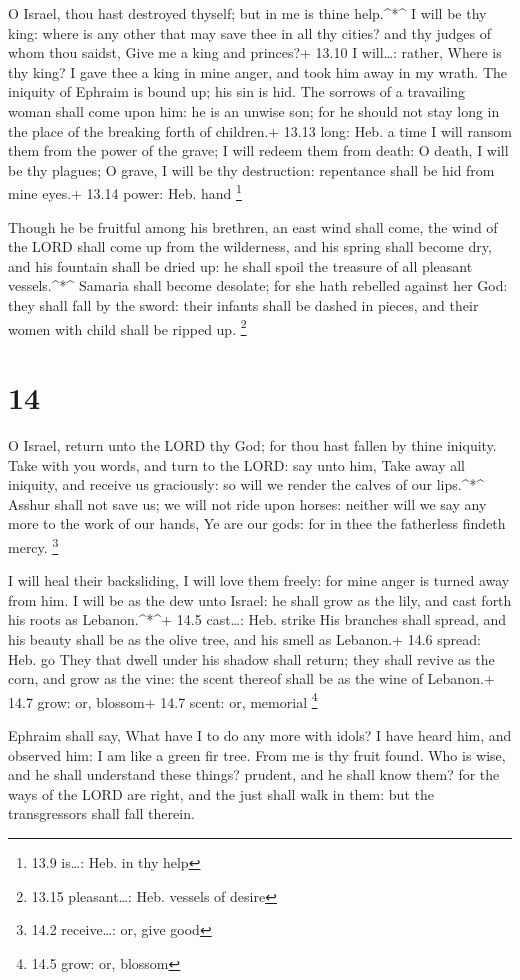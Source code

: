  O Israel, thou hast destroyed thyself; but in me is thine
help.\^{}*\^{}  I will be thy king: where is any other that
may save thee in all thy cities? and thy judges of whom thou saidst,
Give me a king and princes?+ 13.10 I will\ldots: rather, Where is thy
king?  I gave thee a king in mine anger, and took him away
in my wrath.  The iniquity of Ephraim is bound up; his sin
is hid.  The sorrows of a travailing woman shall come upon
him: he is an unwise son; for he should not stay long in the place of
the breaking forth of children.+ 13.13 long: Heb. a time  I
will ransom them from the power of the grave; I will redeem them from
death: O death, I will be thy plagues; O grave, I will be thy
destruction: repentance shall be hid from mine eyes.+ 13.14 power: Heb.
hand \footnote{13.9 is\ldots: Heb. in thy help}

 Though he be fruitful among his brethren, an east wind
shall come, the wind of the LORD shall come up from the wilderness, and
his spring shall become dry, and his fountain shall be dried up: he
shall spoil the treasure of all pleasant vessels.\^{}*\^{} 
Samaria shall become desolate; for she hath rebelled against her God:
they shall fall by the sword: their infants shall be dashed in pieces,
and their women with child shall be ripped up. \footnote{13.15
  pleasant\ldots: Heb. vessels of desire}

\hypertarget{section-13}{%
\section{14}\label{section-13}}

 O Israel, return unto the LORD thy God; for thou hast
fallen by thine iniquity.  Take with you words, and turn to
the LORD: say unto him, Take away all iniquity, and receive us
graciously: so will we render the calves of our lips.\^{}*\^{}
 Asshur shall not save us; we will not ride upon horses:
neither will we say any more to the work of our hands, Ye are our gods:
for in thee the fatherless findeth mercy. \footnote{14.2 receive\ldots:
  or, give good}

 I will heal their backsliding, I will love them freely: for
mine anger is turned away from him.  I will be as the dew
unto Israel: he shall grow as the lily, and cast forth his roots as
Lebanon.\^{}*\^{}+ 14.5 cast\ldots: Heb. strike  His
branches shall spread, and his beauty shall be as the olive tree, and
his smell as Lebanon.+ 14.6 spread: Heb. go  They that dwell
under his shadow shall return; they shall revive as the corn, and grow
as the vine: the scent thereof shall be as the wine of Lebanon.+ 14.7
grow: or, blossom+ 14.7 scent: or, memorial \footnote{14.5 grow: or,
  blossom}

 Ephraim shall say, What have I to do any more with idols? I
have heard him, and observed him: I am like a green fir tree. From me is
thy fruit found.  Who is wise, and he shall understand these
things? prudent, and he shall know them? for the ways of the LORD are
right, and the just shall walk in them: but the transgressors shall fall
therein.
